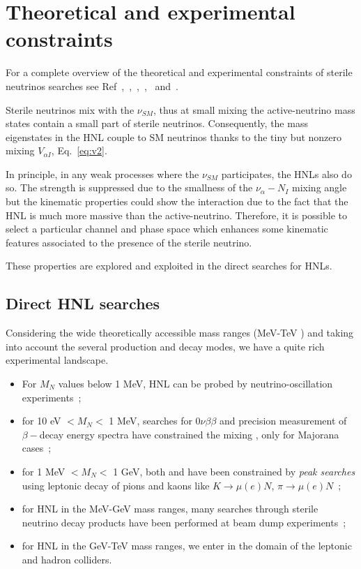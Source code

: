 \section{Theoretical and experimental constraints} \label{sec:currentlimits}
For a complete overview of the theoretical and experimental constraints of sterile neutrinos searches see Ref~\cite{Deppisch_2015},~\cite{10.3389/fphy.2018.00040},~\cite{PhysRevD.78.013010},~\cite{Drewes_2017},~\cite{DREWES2017250} and~\cite{Antusch_2014}.


Sterile neutrinos mix with the $\nu_{SM}$, thus at small mixing the
active-neutrino mass states contain a small part of sterile neutrinos. Consequently, the mass eigenstates in the HNL couple to SM neutrinos thanks to the tiny but nonzero mixing $V_{\alpha I}$, Eq.~\ref{eq:v2}.

In principle, in any weak processes where the $\nu_{SM}$ participates, the HNLs also do so. The strength is suppressed due to the smallness of the $\nu_\alpha - N_I$ mixing angle but the kinematic properties could show the interaction due to the fact that the HNL is much more massive than the active-neutrino.
Therefore, it is possible to select a particular channel and phase space which enhances some kinematic features associated to the presence of the sterile neutrino.

These properties are explored and exploited in the direct searches for HNLs.



\subsection{Direct HNL searches}
Considering the wide theoretically accessible mass ranges (MeV-TeV ) and taking into account
the several production and decay modes, we have a quite rich
experimental landscape. 
\begin{itemize}
\item For $M_N$ values below 1 MeV, HNL can be probed by
  neutrino-oscillation experiments~\cite{de_Gouv_a_2005};
\item for 10 eV $< M_N <$ 1 MeV, searches for
  $0\nu\beta\beta$ and precision measurement of $\beta-$decay energy
  spectra have constrained the mixing \mixpare, only for Majorana cases~\cite{Deppisch_2015};
\item for 1 MeV $< M_N <$ 1 GeV, both \mixpare and \mixparm have been
  constrained by \emph{peak searches} using leptonic decay of pions
  and kaons like $K \rightarrow \mu(e) N$, $\pi \rightarrow \mu(e)
  N$~\cite{Liventsev_2013};
\item for HNL in the MeV-GeV mass ranges, many searches through
  sterile neutrino decay products have been performed at beam dump experiments~\cite{DORENBOSCH1986473};
\item for HNL in the GeV-TeV mass ranges, we enter in the domain of
  the leptonic and hadron colliders.
\end{itemize}

